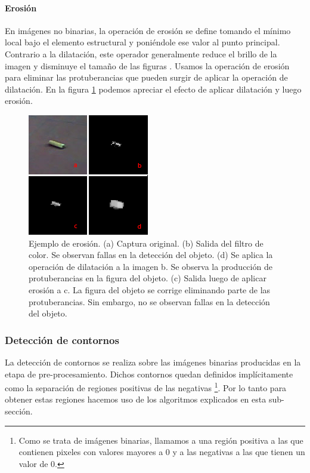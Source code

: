 	\paragraph{Erosi\'on}
En imágenes no binarias, la operación de erosión se define tomando el mínimo local bajo el elemento estructural y poniéndole ese valor al punto principal. Contrario a la dilatación, este operador generalmente reduce el brillo de la imagen y disminuye el tamaño de las figuras \cite{nasa-dilate-erode}. Usamos la operación de erosión para eliminar las protuberancias que pueden surgir de aplicar la operación de dilatación. En la figura \ref{fig:erode} podemos apreciar el efecto de aplicar dilatación y luego erosión.

\begin{figure}[tpb]
\begin{center}
  \includegraphics[scale=0.8]{figuras/erosion.png}
\end{center}
  \caption{\small Ejemplo de erosión. (a) Captura original. (b) Salida del filtro de color. Se observan fallas en la detección del objeto. (d) Se aplica la operación de dilatación a la imagen b. Se observa la producción de protuberancias en la figura del objeto. (c) Salida luego de aplicar erosión a c. La figura del objeto se corrige eliminando parte de las protuberancias. Sin embargo, no se observan fallas en la detección del objeto. }
  \label{fig:erode}
\end{figure}

	\subsubsection{Detección de contornos}
	La detección de contornos se realiza sobre las imágenes binarias producidas en la etapa de pre-procesamiento. Dichos contornos
	quedan definidos implícitamente como la separación de regiones 
	positivas de las negativas \footnote{ Como se trata de imágenes 
	binarias, llamamos a una región positiva a las que contienen 
	pixeles con valores mayores a 0 y a las negativas a las que tienen 
	un valor de 0.}. Por lo tanto para obtener estas regiones hacemos 
	uso de los algoritmos explicados en esta sub-sección.
	
